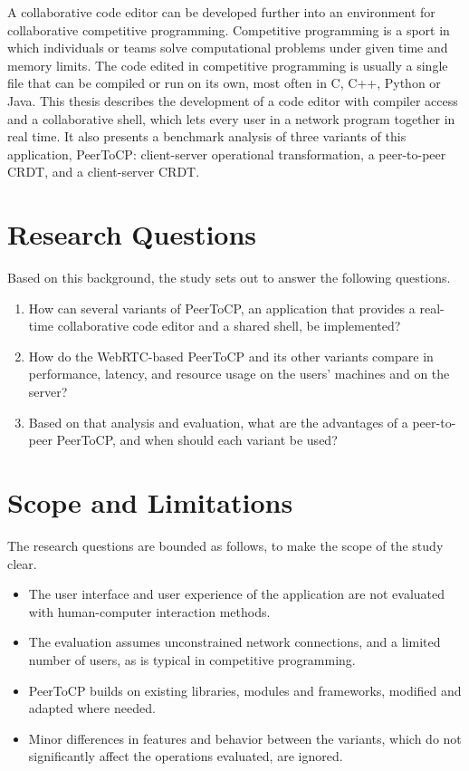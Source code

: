 A collaborative code editor can be developed further into an environment for collaborative competitive programming. Competitive programming is a sport in which individuals or teams solve computational problems under given time and memory limits. The code edited in competitive programming is usually a single file that can be compiled or run on its own, most often in C, C++, Python or Java. This thesis describes the development of a code editor with compiler access and a collaborative shell, which lets every user in a network program together in real time. It also presents a benchmark analysis of three variants of this application, PeerToCP: client-server operational transformation, a peer-to-peer CRDT, and a client-server CRDT.

\section{Research Questions}
\label{sec:definisiMasalah}

Based on this background, the study sets out to answer the following questions.

\begin{enumerate}
    \item How can several variants of PeerToCP, an application that provides a real-time collaborative code editor and a shared shell, be implemented?
    \item How do the WebRTC-based PeerToCP and its other variants compare in performance, latency, and resource usage on the users' machines and on the server?
    \item Based on that analysis and evaluation, what are the advantages of a peer-to-peer PeerToCP, and when should each variant be used?
\end{enumerate}

\section{Scope and Limitations}
\label{sec:batasanMasalah}

The research questions are bounded as follows, to make the scope of the study clear.

\begin{itemize}
    \item The user interface and user experience of the application are not evaluated with human-computer interaction methods.
    \item The evaluation assumes unconstrained network connections, and a limited number of users, as is typical in competitive programming.
    \item PeerToCP builds on existing libraries, modules and frameworks, modified and adapted where needed.
    \item Minor differences in features and behavior between the variants, which do not significantly affect the operations evaluated, are ignored.
\end{itemize}

